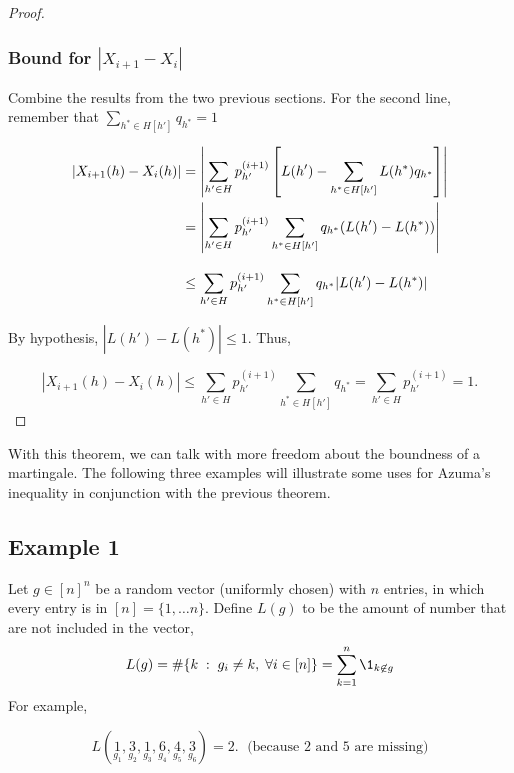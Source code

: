\begin{proof}
\subsubsection*{Bound for $|X_{i+1}- X_i|$}
Combine the results from the two previous sections. For the second line, remember that $\sum_{h^*\in H[h']} q_{h^*} = 1$
\[ \everymath{\displaystyle}\arraycolsep=1.4pt\def\arraystretch{2.9} 
\begin{array}{rcl}
    |X_{i+1}(h)- X_i(h)| & = & \left|\sum_{h' \in H}p_{h'}^{(i+1)} \left[ L(h') - \sum_{h^* \in H[h']}  L(h^*)q_{h^*}\right] \right|\\
    & = & \left|\sum_{h' \in H}p_{h'}^{(i+1)} \sum_{h^* \in H[h']} q_{h^*}(L(h') - L(h^*)) \right|\\
    & \leq & \sum_{h' \in H}p_{h'}^{(i+1)} \sum_{h^* \in H[h']} q_{h^*} |L(h') - L(h^*)|
\end{array} \] 

By hypothesis, $|L(h') - L(h^*)| \leq 1$. Thus,

\[|X_{i+1}(h)- X_i(h)| \leq  \sum_{h' \in H}p_{h'}^{(i+1)} \sum_{h^* \in H[h']} q_{h^*} = \sum_{h' \in H}p_{h'}^{(i+1)} = 1. \] 

\end{proof}

With this theorem, we can talk with more freedom about the boundness of a martingale. The following three examples will illustrate some uses for Azuma's inequality in conjunction with the previous theorem.

\subsection*{Example 1}
Let $g \in {[n]}^{n}$ be a random vector (uniformly chosen) with $n$ entries, in which every entry is in $[n] = \{1,\ldots n\}$. Define $L(g)$ to be the amount of number that are not included in the vector,
\[ L(g) = \# \{ k \;:\; g_i \neq k,\; \forall i \in [n]\} = \sum_{k = 1}^{n} \1_{k \not\in g} \] 
For example,

\[ L(\underset{g_1}{1},\underset{g_2}{3},\underset{g_3}{1},\underset{g_4}{6},\underset{g_5}{4},\underset{g_6}{3}) = 2.\;\text{ (because 2 and 5 are missing)} \]

